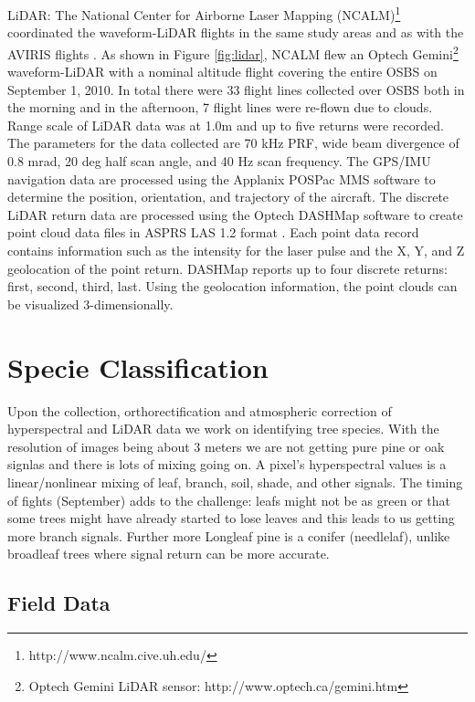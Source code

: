 \documentclass[remotesensing,article,accept,moreauthors,pdftex,12pt,a4paper]{mdpi}
\begin{document}
LiDAR: The National Center for Airborne Laser Mapping (NCALM)\footnote{http://www.ncalm.cive.uh.edu/} coordinated the waveform-LiDAR flights in the same study areas and as  with the AVIRIS flights \cite{neon2010aopdatarelease}. As shown in Figure \ref{fig:lidar}, NCALM flew an Optech Gemini\footnote{Optech Gemini LiDAR sensor: http://www.optech.ca/gemini.htm} waveform-LiDAR with a nominal altitude flight covering the entire OSBS on September 1, 2010. In total there were 33 flight lines collected over OSBS both in the morning and in the afternoon, 7 flight lines were re-flown due to clouds. Range scale of LiDAR data was at 1.0m and up to five returns were recorded. The parameters for the data collected are 70 kHz PRF, wide beam divergence of 0.8 mrad, 20 deg half scan angle, and 40 Hz scan frequency. The GPS/IMU navigation data are processed using the Applanix POSPac MMS software to determine the position, orientation, and trajectory of the aircraft. The discrete LiDAR return data are processed using the Optech DASHMap software to create point cloud data files in ASPRS LAS 1.2 format \cite{las12format}. Each point data record contains information such as the intensity for the laser pulse and the X, Y, and Z geolocation of the point return. DASHMap reports up to four discrete returns: first, second, third, last. Using the geolocation information, the point clouds can be visualized 3-dimensionally.




\section{Specie Classification}

Upon the collection, orthorectification and atmospheric correction of hyperspectral and LiDAR data we work on identifying tree species. With the resolution of images being about 3 meters we are not getting pure pine or oak signlas and there is lots of mixing going on. A pixel's hyperspectral values is a linear/nonlinear mixing of leaf, branch, soil, shade, and other signals. The timing of fights (September) adds to the challenge: leafs might not be as green or that some trees might have already started to lose leaves and this leads to us getting more branch signals. Further more Longleaf pine is a conifer (needlelaf), unlike broadleaf trees where signal return can be more accurate. 

\subsection{Field Data}
\end{document}

